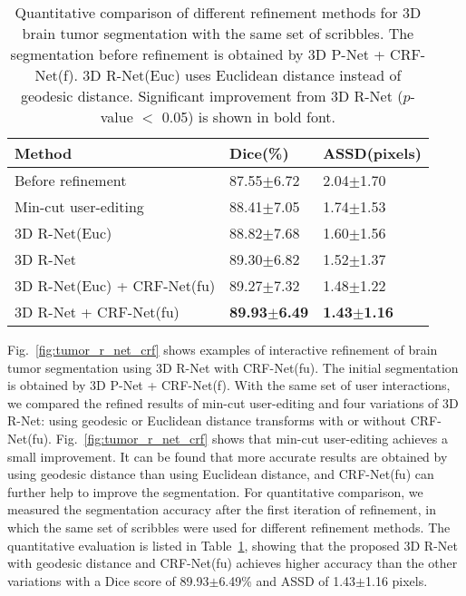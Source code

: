 \documentclass[10pt,journal,compsoc]{IEEEtran}
\begin{document}
\begin{table}
	\centering
	\small
	\caption{Quantitative comparison of different refinement methods for 3D brain tumor segmentation with the same set of scribbles. The segmentation before refinement is obtained by 3D P-Net + CRF-Net(f). 3D R-Net(Euc) uses Euclidean distance instead of geodesic distance. Significant improvement from 3D R-Net ($p$-value $<$ 0.05) is shown in bold font.}
	\label{lab:tumor_r_net_crf}
	\begin{tabular}{lll}
		
		\hline
		Method & Dice(\%) & ASSD(pixels) \\ \hline
		Before refinement & 87.55$\pm$6.72 & 2.04$\pm$1.70 \\
		Min-cut user-editing & 88.41$\pm$7.05 & 1.74$\pm$1.53 \\
		3D R-Net(Euc) & 88.82$\pm$7.68 &  1.60$\pm$1.56 \\ 
		
		3D R-Net & 89.30$\pm$6.82 & 1.52$\pm$1.37 \\
		3D R-Net(Euc) + CRF-Net(fu) & 89.27$\pm$7.32 & 1.48$\pm$1.22 \\
		3D R-Net + CRF-Net(fu) & \textbf{89.93$\pm$6.49} & \textbf{1.43$\pm$1.16} \\  
		\hline
	\end{tabular}
	
\end{table}

Fig.~\ref{fig:tumor_r_net_crf} shows examples of interactive refinement of brain tumor segmentation using 3D R-Net with CRF-Net(fu). The initial segmentation is obtained by 3D P-Net + CRF-Net(f). With the same set of user interactions, we compared the refined results of min-cut user-editing and four variations of 3D R-Net: using geodesic or Euclidean distance transforms with or without CRF-Net(fu). Fig.~\ref{fig:tumor_r_net_crf} shows that min-cut user-editing achieves a small improvement. %
It can be found that more accurate results are obtained by using geodesic distance than using Euclidean distance, and CRF-Net(fu) can further help to improve the segmentation. For quantitative comparison, we measured the segmentation accuracy after the first iteration of refinement, in which the same set of scribbles were used for different refinement methods. The quantitative evaluation is listed in Table~\ref{lab:tumor_r_net_crf}, showing that the proposed 3D R-Net with geodesic distance and CRF-Net(fu) achieves higher accuracy than the other variations with a Dice score of 89.93$\pm$6.49\% and ASSD of 1.43$\pm$1.16 pixels.
\end{document}
